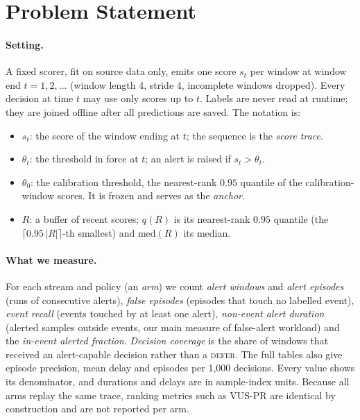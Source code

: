 \section{Problem Statement}\label{sec:problem}

\paragraph{Setting.}
A fixed scorer, fit on source data only, emits one score $s_t$ per window at window
end $t=1,2,\dots$ (window length 4, stride 4, incomplete windows dropped). Every decision
at time $t$ may use only scores up to $t$. Labels are never read at runtime; they are
joined offline after all predictions are saved. The notation is:

\begin{itemize}[leftmargin=1.6em, itemsep=1pt, topsep=2pt]
  \item $s_t$: the score of the window ending at $t$; the sequence is the \emph{score trace}.
  \item $\theta_t$: the threshold in force at $t$; an alert is raised if $s_t > \theta_t$.
  \item $\theta_0$: the calibration threshold, the nearest-rank $0.95$ quantile of the
    calibration-window scores. It is frozen and serves as the \emph{anchor}.
  \item $R$: a buffer of recent scores; $q(R)$ is its nearest-rank $0.95$ quantile (the
    $\lceil 0.95\,|R|\rceil$-th smallest) and $\mathrm{med}(R)$ its median.
\end{itemize}

\paragraph{What we measure.}
For each stream and policy (an \emph{arm}) we count \emph{alert windows} and
\emph{alert episodes} (runs of consecutive alerts), \emph{false episodes} (episodes that
touch no labelled event), \emph{event recall} (events touched by at least one alert),
\emph{non-event alert duration} (alerted samples outside events, our main measure of
false-alert workload) and the \emph{in-event alerted fraction}. \emph{Decision
coverage} is the share of windows that received an alert-capable decision rather than a
\textsc{defer}. The full tables also give episode precision, mean delay and episodes per
1{,}000 decisions. Every value shows its denominator, and durations and delays are in
sample-index units. Because all arms replay the same trace, ranking metrics such as
VUS-PR are identical by construction and are not reported per arm.


